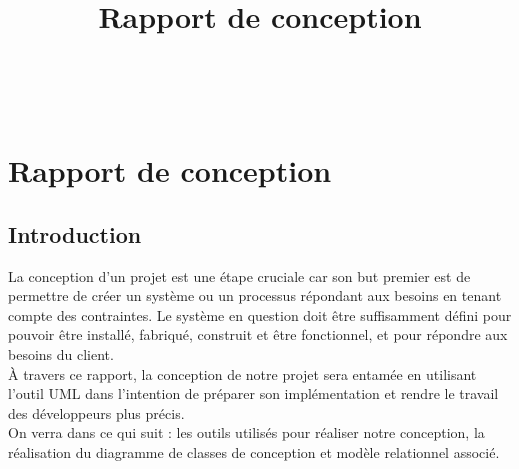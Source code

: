 \documentclass[11pt,fleqn]{book} %
\begin{document}
\title{Rapport de conception}

\begingroup
{}
\endgroup


\newpage
~\vfill
\thispagestyle{empty}




\pagestyle{empty} %

\tableofcontents %


\pagestyle{fancy} %


\chapter{Rapport de conception}
\section{Introduction}
La conception d’un projet est une étape cruciale car son but premier est de permettre de créer un système ou un processus répondant aux besoins en tenant compte des contraintes. Le système en question doit être suffisamment défini pour pouvoir être installé, fabriqué, construit et être fonctionnel, et pour répondre aux besoins du client. \\
À travers ce rapport, la conception de notre projet sera entamée en utilisant l’outil UML dans l’intention de préparer son implémentation et rendre le travail des développeurs plus précis. \\
On verra dans ce qui suit : les outils utilisés pour réaliser notre conception, la réalisation du diagramme de classes de conception et modèle relationnel associé.
\end{document}
